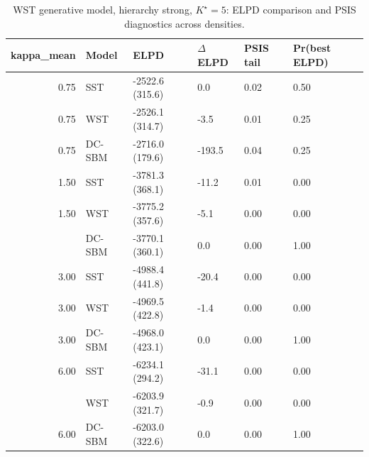 \begin{table}
\centering
\caption{WST generative model, hierarchy strong, $K^\star=5$: ELPD comparison and PSIS diagnostics across densities.}
\centering
\begin{tabular}[t]{rlllll}
\toprule
kappa_mean & Model & ELPD & $\Delta$ELPD & PSIS tail & Pr(best ELPD)\\
\midrule
0.75 & SST & -2522.6 (315.6) & 0.0 & 0.02 & 0.50\\
0.75 & WST & -2526.1 (314.7) & -3.5 & 0.01 & 0.25\\
0.75 & DC-SBM & -2716.0 (179.6) & -193.5 & 0.04 & 0.25\\
1.50 & SST & -3781.3 (368.1) & -11.2 & 0.01 & 0.00\\
1.50 & WST & -3775.2 (357.6) & -5.1 & 0.00 & 0.00\\
\addlinespace
1.50 & DC-SBM & -3770.1 (360.1) & 0.0 & 0.00 & 1.00\\
3.00 & SST & -4988.4 (441.8) & -20.4 & 0.00 & 0.00\\
3.00 & WST & -4969.5 (422.8) & -1.4 & 0.00 & 0.00\\
3.00 & DC-SBM & -4968.0 (423.1) & 0.0 & 0.00 & 1.00\\
6.00 & SST & -6234.1 (294.2) & -31.1 & 0.00 & 0.00\\
\addlinespace
6.00 & WST & -6203.9 (321.7) & -0.9 & 0.00 & 0.00\\
6.00 & DC-SBM & -6203.0 (322.6) & 0.0 & 0.00 & 1.00\\
\bottomrule
\end{tabular}
\end{table}
